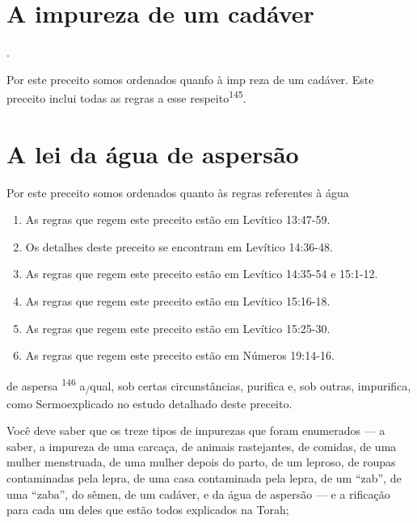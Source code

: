\section{A impureza de um cadáver}
.

Por este preceito somos ordenados quanfo à imp reza de um cadá­ver. Este
preceito inclui todas as regras a esse respeito\textsuperscript{145}.

\section{A lei da água de aspersão}

Por este preceito somos ordenados quanto às regras referentes à água

\begin{enumerate}
\def\labelenumi{\arabic{enumi}.}
\setcounter{enumi}{139}
\item
 
 As regras que regem este preceito estão em Levítico 13:47-59.
 
\item
 
 Os detalhes deste preceito se encontram em Levítico 14:36-48.
 
\item
 
 As regras que regem este preceito estão em Levítico 14:35-54 e
 15:1-12.
 
\item
 
 As regras que regem este preceito estão em Levítico 15:16-18.
 
\item
 
 As regras que regem este preceito estão em Levítico 15:25-30.
 
\item
 
 As regras que regem este preceito estão em Números 19:14-16.
 
\end{enumerate}

de aspersa \textsuperscript{146} a\textsubscript{/}qual, sob certas
circunstâncias, purifica e, sob outras, impuri­fica, como Sermoexplicado
no estudo detalhado deste preceito.

Você deve saber que os treze tipos de impurezas que foram enume­rados
--- a saber, a impureza de uma carcaça, de animais rastejantes, de
comi­das, de uma mulher menstruada, de uma mulher depois do parto, de um
lepro­so, de roupas contaminadas pela lepra, de uma casa contaminada
pela lepra, de um ``zab'', de uma ``zaba'', do sêmen, de um cadáver, e da
água de aspersão --- e a rificação para cada um deles que estão todos
explicados na Torah;

